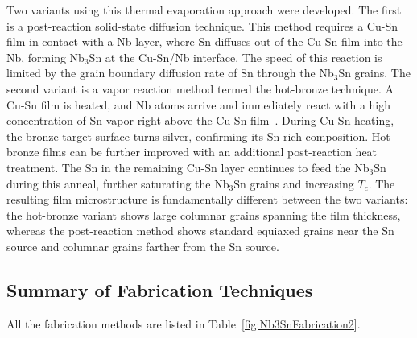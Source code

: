     Two variants using this thermal evaporation approach were developed. The first is a post-reaction solid-state diffusion technique. This method requires a Cu-Sn film in contact with a Nb layer, where Sn diffuses out of the Cu-Sn film into the Nb, forming Nb$_3$Sn at the Cu-Sn/Nb interface. The speed of this reaction is limited by the grain boundary diffusion rate of Sn through the Nb$_3$Sn grains. The second variant is a vapor reaction method termed the hot-bronze technique. A Cu-Sn film is heated, and Nb atoms arrive and immediately react with a high concentration of Sn vapor right above the Cu-Sn film~\cite{withanageRapidNbSn2021}. During Cu-Sn heating, the bronze target surface turns silver, confirming its Sn-rich composition. Hot-bronze films can be further improved with an additional post-reaction heat treatment. The Sn in the remaining Cu-Sn layer continues to feed the Nb$_3$Sn during this anneal, further saturating the Nb$_3$Sn grains and increasing $T_c$. The resulting film microstructure is fundamentally different between the two variants: the hot-bronze variant shows large columnar grains spanning the film thickness, whereas the post-reaction method shows standard equiaxed grains near the Sn source and columnar grains farther from the Sn source.

    
    \subsection{Summary of Fabrication Techniques}
    
    All the fabrication methods are listed in Table~\ref{fig:Nb3SnFabrication2}. 
    
    
    
